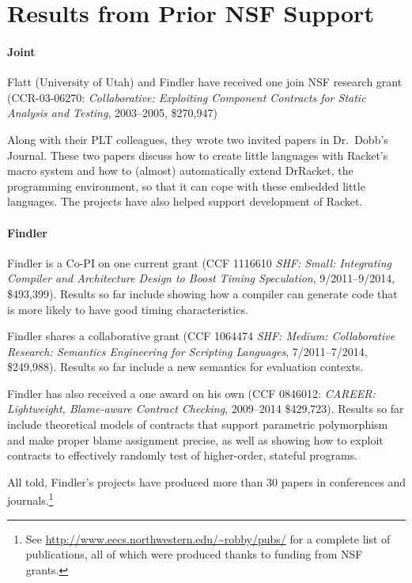 \documentclass[11pt]{article}
\begin{document}
\section{Results from Prior NSF Support}\label{sec:prior-results}

\paragraph{Joint}

Flatt (University of Utah) and Findler have received one join NSF
research grant (CCR-03-06270: \textit{Collaborative: Exploiting Component Contracts for Static Analysis and Testing}, 2003--2005, \$270,947)

Along with their PLT colleagues, they wrote two invited papers in
Dr.~Dobb's Journal. These two papers discuss how to create little
languages with Racket's macro system and how to (almost)
automatically extend DrRacket, the programming environment, so that it
can cope with these embedded little languages. The projects have also
helped support development of Racket.

\paragraph{Findler}

Findler is a Co-PI on one current grant (CCF 1116610 \textit{SHF:
  Small: Integrating Compiler and Architecture Design to Boost Timing
  Speculation}, 9/2011--9/2014, \$493,399).  Results so far include
showing how a compiler can generate code that is more likely to have
good timing characteristics.

Findler shares a collaborative grant (CCF 1064474 \textit{SHF: Medium:
  Collaborative Research: Semantics Engineering for Scripting
  Languages}, 7/2011--7/2014, \$249,988). Results so far include a
new semantics for evaluation contexts.

Findler has also received a one award on his own (CCF 0846012:
\textit{CAREER: Lightweight, Blame-aware Contract Checking},
2009--2014 \$429,723). Results so far include theoretical models of
contracts that support parametric polymorphism and make proper blame
assignment precise, as well as showing how to exploit contracts to
effectively randomly test of higher-order, stateful programs.

All told, Findler's projects have produced more than 30 papers
in conferences and journals.\footnote{See
  \url{http://www.eecs.northwestern.edu/~robby/pubs/} for a complete
  list of publications, all of which were produced thanks to funding
  from NSF grants.}
\end{document}
